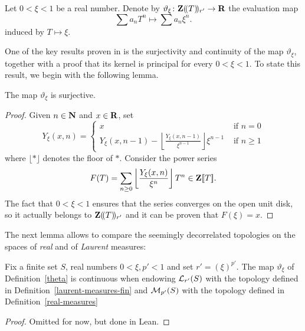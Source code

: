 \begin{definition}
  \label{theta}
  \leanok
  Let $0<\xi <1$ be a real number. Denote by $\vartheta_{\xi}\colon \mathbf{Z}(\!(T)\!)_{r'}\rightarrow \mathbf{R}$ the evaluation map
  \[
    \sum a_nT^n\longmapsto \sum a_n\xi^n.
  \]
induced by $T\mapsto \xi$.
\end{definition}

One of the key results proven in \cite[\S 6]{Analytic} is the surjectivity and continuity of the map $\vartheta_\xi$, together with a proof that its kernel is principal for every $0<\xi<1$. To state this result, we begin with the following lemma.


\begin{lemma}
  \label{theta-surjective}
  \leanok
  The map $\vartheta_{\xi}$ is surjective.
\end{lemma}

\begin{proof}
  \leanok
  Given $n\in\mathbf{N}$ and $x\in\mathbf{R}$, set
	\[
		Y_\xi(x, n)=
		\begin{cases}
			x&\text{ if } n = 0 \\
			Y_\xi(x,n-1) - \left\lfloor \frac{Y_\xi(x,n-1)}{\xi^{n-1}} \right\rfloor \xi^{n-1} & \text{ if } n \ge 1
		\end{cases}
	\]
where $\lfloor \ast \rfloor$ denotes the floor of $\ast$. Consider the power series
  \[
    F(T)=\sum_{n\geq 0}\left\lfloor \frac{Y_\xi(x,n)}{\xi^n}\right\rfloor T^n\in\mathbf{Z}[\![T]\!].
  \]
	The fact that $0<\xi<1$ ensures that the series converges on the open unit disk, so it actually belongs to $\mathbf{Z}(\!(T)\!)_{r'}$ and it can be proven that $F(\xi)=x$.
\end{proof}
The next lemma allows to compare the seemingly decorrelated topologies on the spaces of \emph{real} and of \emph{Laurent} measures:
\begin{lemma}
	\label{theta-continuous}
	\leanok
Fix a finite set $S$, real numbers $0<\xi,p'<1$ and set $r'=(\xi)^{p'}$. The map $\vartheta_\xi$ of Definition~\ref{theta} is continuous when endowing $\mathcal L_{r'}(S)$ with the topology defined in Definition~\ref{laurent-measures-fin} and $\mathcal M_{p'}(S)$ with the topology defined in Definition~\ref{real-measures}
\end{lemma}
\begin{proof}
  \leanok
  Omitted for now, but done in Lean.
\end{proof}

